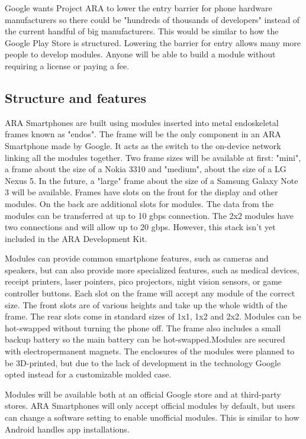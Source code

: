 Google wants Project ARA to lower the entry barrier for phone hardware manufacturers so there could be "hundreds of thousands of developers" instead of the current handful of big manufacturers. This would be similar to how the Google Play Store is structured. Lowering the barrier for entry allows many more people to develop modules. Anyone will be able to build a module without requiring a license or paying a fee.

\subsection{Structure and features}

ARA Smartphones are built using modules inserted into metal endoskeletal frames known as "endos". The frame will be the only component in an ARA Smartphone made by Google. It acts as the switch to the on-device network linking all the modules together. Two frame sizes will be available at first: "mini", a frame about the size of a Nokia 3310 and "medium", about the size of a LG Nexus 5. In the future, a "large" frame about the size of a Samsung Galaxy Note 3 will be available. Frames have slots on the front for the display and other modules. On the back are additional slots for modules. The data from the modules can be transferred at up to 10 gbps connection. The 2x2 modules have two connections and will allow up to 20 gbps. However, this stack isn't yet included in the ARA Development Kit.

Modules can provide common smartphone features, such as cameras and speakers, but can also provide more specialized features, such as medical devices, receipt printers, laser pointers, pico projectors, night vision sensors, or game controller buttons. Each slot on the frame will accept any module of the correct size. The front slots are of various heights and take up the whole width of the frame. The rear slots come in standard sizes of 1x1, 1x2 and 2x2. Modules can be hot-swapped without turning the phone off. The frame also includes a small backup battery so the main battery can be hot-swapped.Modules are secured with electropermanent magnets. The enclosures of the modules were planned to be 3D-printed, but due to the lack of development in the technology Google opted instead for a customizable molded case.

Modules will be available both at an official Google store and at third-party stores. ARA Smartphones will only accept official modules by default, but users can change a software setting to enable unofficial modules. This is similar to how Android handles app installations.

